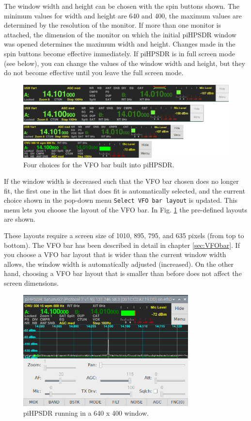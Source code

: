 \documentclass[12pt]{book}
\def\rett#1{\texttt{\color{red}#1}}
\begin{document}
The window width and height can be chosen with the spin buttons shown. The minimum
values for width and height are 640 and 400, the maximum values are determined by
the resolution of the monitor. If more than one monitor is attached, the dimension
of the monitor on which the initial piHPSDR window was opened determines
the maximum width and height. Changes made in the spin buttons become effective
immediately. If piHPSDR is in full screen mode (see below), you can change the
values of the window width and height, but they do not become effective until
you leave the full screen mode.

\begin{figure}[ht!]
\center
\includegraphics[width=12cm]{VFObarChoice.png}
\caption{Four choices for the VFO bar built into piHPSDR.}
\label{fig:VFObarChoice}
\end{figure}

If the window width is decreased such that the VFO bar chosen does no longer fit,
the first one in the list that does fit is automatically selected, and the
current choice shown in the 
 pop-down menu \rett{Select VFO bar layout} is updated. This menu lets you choose
 the layout of the VFO
bar. In Fig. \ref{fig:VFObarChoice} the pre-defined layouts are shown.



These layouts require a screen size of 1010, 895, 795, and 635 pixels (from top to
bottom).
The VFO bar has been described in detail in chapter
\ref{sec:VFObar}. If you choose a VFO bar layout that is wider than the current
window width allows, the window width is automatically adjusted (increased). On the
other hand, choosing a VFO bar layout that is smaller than before does not affect
the screen dimensions.

\begin{figure}[ht!]
\center
\includegraphics[width=9cm]{640x400.png}
\caption{piHPSDR running in a 640 x 400 window.}
\label{fig:640x400}
\end{figure}
\end{document}
